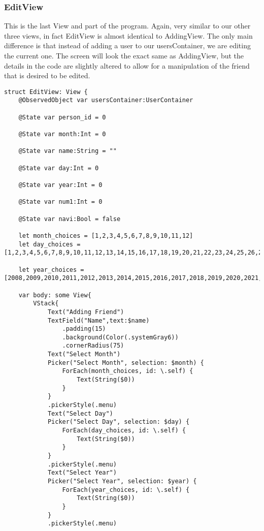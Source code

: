 \documentclass{article}
\theoremstyle{theorem}
\theoremstyle{definition}
\theoremstyle{remark}
\begin{document}
\subsubsection{EditView}

This is the last View and part of the program. Again, very similar to our other three views, in fact EditView is almost identical to AddingView. The only main difference is that instead of adding a user to our usersContainer, we are editing the current one. The screen will look the exact same as AddingView, but the details in the code are slightly altered to allow for a manipulation of the friend that is desired to be edited.

\begin{verbatim}
struct EditView: View {
    @ObservedObject var usersContainer:UserContainer
    
    @State var person_id = 0
    
    @State var month:Int = 0
    
    @State var name:String = ""
    
    @State var day:Int = 0
    
    @State var year:Int = 0
    
    @State var num1:Int = 0
    
    @State var navi:Bool = false
    
    let month_choices = [1,2,3,4,5,6,7,8,9,10,11,12]
    let day_choices = [1,2,3,4,5,6,7,8,9,10,11,12,13,14,15,16,17,18,19,20,21,22,23,24,25,26,27,28,29,30,31]
    
    let year_choices = [2008,2009,2010,2011,2012,2013,2014,2015,2016,2017,2018,2019,2020,2021,2022]
    
    var body: some View{
        VStack{
            Text("Adding Friend")
            TextField("Name",text:$name)
                .padding(15)
                .background(Color(.systemGray6))
                .cornerRadius(75)
            Text("Select Month")
            Picker("Select Month", selection: $month) {
                ForEach(month_choices, id: \.self) {
                    Text(String($0))
                }
            }
            .pickerStyle(.menu)
            Text("Select Day")
            Picker("Select Day", selection: $day) {
                ForEach(day_choices, id: \.self) {
                    Text(String($0))
                }
            }
            .pickerStyle(.menu)
            Text("Select Year")
            Picker("Select Year", selection: $year) {
                ForEach(year_choices, id: \.self) {
                    Text(String($0))
                }
            }
            .pickerStyle(.menu)
            

\end{verbatim}
\end{document}
